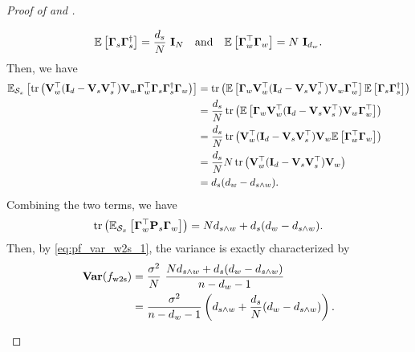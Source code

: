 \begin{proof}[Proof of  and ]
\begin{enumerate}[label=(\alph*)]
        \begin{align*}
            \mathbb{E}\left[\boldsymbol{\Gamma}_s \boldsymbol{\Gamma}_s^\dagger\right] = \frac{d_s}{N}\ \mathbf{I}_N \quad \text{and} \quad \mathbb{E}\left[\boldsymbol{\Gamma}_w^\top \boldsymbol{\Gamma}_w\right] = N\ \mathbf{I}_{d_w}.
        \end{align*}
        Then, we have
        \begin{align*}
            \mathbb{E}_{{\mathcal{S}}_x}\left[\mathop{\mathrm{tr}}\left(\mathbf{V}_w^\top (\mathbf{I}_d - \mathbf{V}_s \mathbf{V}_s^\top) \mathbf{V}_w \boldsymbol{\Gamma}_w^\top \boldsymbol{\Gamma}_s \boldsymbol{\Gamma}_s^\dagger \boldsymbol{\Gamma}_w\right)\right] 
            &= \mathop{\mathrm{tr}}\left(\mathbb{E}\left[\boldsymbol{\Gamma}_w \mathbf{V}_w^\top (\mathbf{I}_d - \mathbf{V}_s \mathbf{V}_s^\top) \mathbf{V}_w \boldsymbol{\Gamma}_w^\top\right] \mathbb{E}\left[\boldsymbol{\Gamma}_s \boldsymbol{\Gamma}_s^\dagger\right]\right) \\
            &= \frac{d_s}{N} \mathop{\mathrm{tr}}\left(\mathbb{E}\left[\boldsymbol{\Gamma}_w \mathbf{V}_w^\top (\mathbf{I}_d - \mathbf{V}_s \mathbf{V}_s^\top) \mathbf{V}_w \boldsymbol{\Gamma}_w^\top\right]\right) \\
            &= \frac{d_s}{N} \mathop{\mathrm{tr}}\left(\mathbf{V}_w^\top (\mathbf{I}_d - \mathbf{V}_s \mathbf{V}_s^\top) \mathbf{V}_w \mathbb{E}\left[\boldsymbol{\Gamma}_w^\top \boldsymbol{\Gamma}_w\right]\right) \\
            &= \frac{d_s}{N} N \mathop{\mathrm{tr}}\left(\mathbf{V}_w^\top (\mathbf{I}_d - \mathbf{V}_s \mathbf{V}_s^\top) \mathbf{V}_w\right) \\
            &= d_s (d_w - d_{s \wedge w}).
        \end{align*}
        Combining the two terms, we have
        \begin{align*}
            \mathop{\mathrm{tr}}\left(\mathbb{E}_{{\mathcal{S}}_x}\left[\boldsymbol{\Gamma}_w^\top \mathbf{P}_s \boldsymbol{\Gamma}_w\right]\right) = N d_{s \wedge w} + d_s (d_w - d_{s \wedge w}).
        \end{align*}
        Then, by \eqref{eq:pf_var_w2s_1}, the variance is exactly characterized by
        \begin{align*}
            \mathbf{Var}(f_{\mathrm{w2s}}) 
            &= \frac{\sigma^2}{N}\ \frac{N d_{s \wedge w} + d_s (d_w - d_{s \wedge w})}{n - d_w -1} \\
            &= \frac{\sigma^2}{n-d_w-1} \left(d_{s \wedge w} + \frac{d_s}{N} (d_w - d_{s \wedge w})\right).
        \end{align*}


\end{enumerate}
\end{proof}
